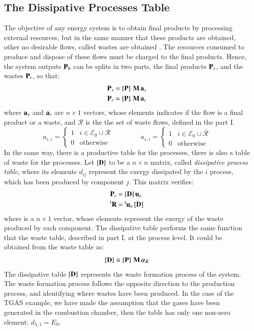\documentclass{ecos2018}
\begin{document}
\subsection{The Dissipative Processes Table}
The objective of any energy system is to obtain final products by processing external resources, but in the same manner that these products are obtained, other no desirable flows, called wastes are obtained \cite{Residues2007}. The resources consumed to produce and dispose of these flows must be charged to the final products. Hence, the system outputs $\mathbf{P}_0$ can be splits in two parts, the final products $\mathbf{P}_s$, and the wastes $\mathbf{P}_r$, so that:
\begin{align}
\mathbf{P}_s&=\left[ \textbf{P} \right]\,\mathbf{M}\,\mathbf{a}_s \\
\mathbf{P}_r&=\left[ \textbf{P} \right]\,\mathbf{M}\,\mathbf{a}_r 
\end{align}
where $\mathbf{a}_s$ and $\mathbf{a}_r$ are $n \times 1$ vectors, whose elements indicates if the flow is a final product or a waste, and $\mathcal{R}$ is the the set of waste flows, defined in the part I.
\begin{equation}
a_{r,i}=\begin{cases}
1 & i\in\mathcal{E}_0 \cup \mathcal{R} \\
0 & \text{otherwise}
\end{cases}
\qquad\qquad
a_{s,i}=\begin{cases}
1 & i\in\mathcal{E}_0 \cup \bar{\mathcal{R}} \\
0 & \text{otherwise}
\end{cases}
\end{equation}
In the same way, there is a productive table for the processes, there is also a table of waste for the processes. Let $\left[ \textbf{D} \right]$ to be a $n \times n$ matrix, called \emph{dissipative process table}, where its elements $d_{ij}$ represent the exergy dissipated by the $i$ process, which has been produced by component $j$. This matrix verifies:
\begin {align}
\mathbf{P} _r & = \left[ \textbf{D} \right] \mathbf{u} _n \\
\prescript{\smash{\mathrm{t}}}{}{\mathbf{R}} & = \prescript{\smash{\mathrm{t}}}{}{\mathbf{u}} _n \left[ \textbf{D} \right]
\end {align}
where  is a $n \times 1$ vector, whose elements represent the exergy of the waste produced by each component. The dissipative table performs the same function that the waste table, described in part I, at the process level. It could be obtained from the waste table as:
\begin{equation}
\label{eq:rctfpdd}
\left[ \textbf{D} \right] \equiv \left[ \textbf{P} \right] \, \mathbf{M} \, \bm{\alpha}_R
\end{equation}
The dissipative table $\left[ \textbf{D} \right]$ represents the waste formation process of the system. The waste formation process follows the opposite direction to the production process, and  identifying where wastes have been produced. In the case of the TGAS example, we have made the assumption that the gases have been generated in the combustion chamber, then the table has only one non-zero element: $d_{5,1}= E_9$.
\end{document}
